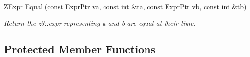\begin{DoxyCompactItemize}
\mbox{\label{classilang_1_1_unroller_a313471de6639a1f277d38f51a3df3470}} 
\mbox{\hyperlink{classilang_1_1_unroller_a9fd0359e3ffd666f8f92ad3c3ef52673}{Z\+Expr}} \mbox{\hyperlink{classilang_1_1_unroller_a313471de6639a1f277d38f51a3df3470}{Equal}} (const \mbox{\hyperlink{namespaceilang_a7c4196c72e53ea4df4b7861af7bc3bce}{Expr\+Ptr}} va, const int \&ta, const \mbox{\hyperlink{namespaceilang_a7c4196c72e53ea4df4b7861af7bc3bce}{Expr\+Ptr}} vb, const int \&tb)
\begin{DoxyCompactList}\small\item\em Return the z3\+::expr representing a and b are equal at their time. \end{DoxyCompactList}\end{DoxyCompactItemize}
\subsection*{Protected Member Functions}
